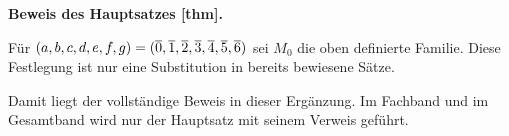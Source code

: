\par{}
\hypertarget{frankl.proof.FranklRareTripleExists}{}
\noindent\textbf{Beweis des Hauptsatzes
  [thm].}\par\medskip
Für \((a,b,c,d,e,f,g)=(\overline{0},\overline{1},\overline{2},\overline{3},
\overline{4},\overline{5},\overline{6})\) sei \(M_0\) die oben definierte Familie.
Diese Festlegung ist nur eine Substitution in bereits bewiesene Sätze.
\begin{tabproofwide}
\end{tabproofwide}
Damit liegt der vollständige Beweis in dieser Ergänzung. Im Fachband
und im Gesamtband wird nur der Hauptsatz mit seinem Verweis geführt.
